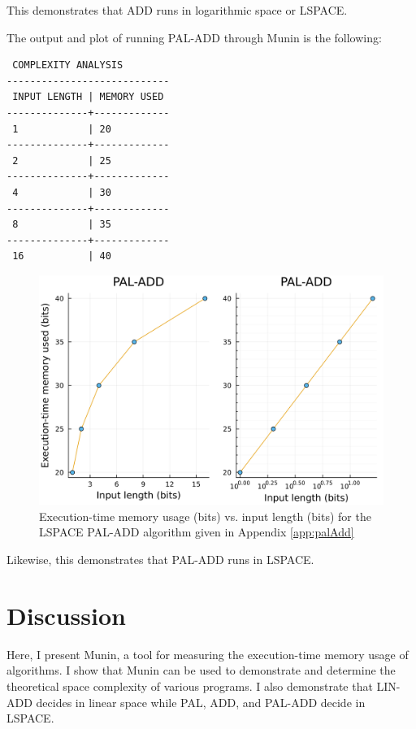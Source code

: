 \documentclass[11pt, a4paper]{article}
\begin{document}
This demonstrates that ADD runs in logarithmic space or LSPACE.

The output and plot of running PAL-ADD through Munin is the following:

\begin{lstlisting}
 COMPLEXITY ANALYSIS
----------------------------
 INPUT LENGTH | MEMORY USED 
--------------+-------------
 1            | 20      
--------------+-------------
 2            | 25      
--------------+-------------
 4            | 30      
--------------+-------------
 8            | 35      
--------------+-------------
 16           | 40      
\end{lstlisting}

\begin{figure}[H]
    \centering
    \includegraphics[width=\columnwidth]{PAL-ADD.png}
    \caption{Execution-time memory usage (bits) vs. input length (bits) for the LSPACE PAL-ADD algorithm given in Appendix \ref{app:palAdd}}
    \label{fig:palAdd}
\end{figure}

Likewise, this demonstrates that PAL-ADD runs in LSPACE.

\section{Discussion}

Here, I present Munin, a tool for measuring the execution-time memory usage of algorithms.
I show that Munin can be used to demonstrate and determine the theoretical space complexity of various programs.
I also demonstrate that LIN-ADD decides in linear space while PAL, ADD, and PAL-ADD decide in LSPACE.
\end{document}
